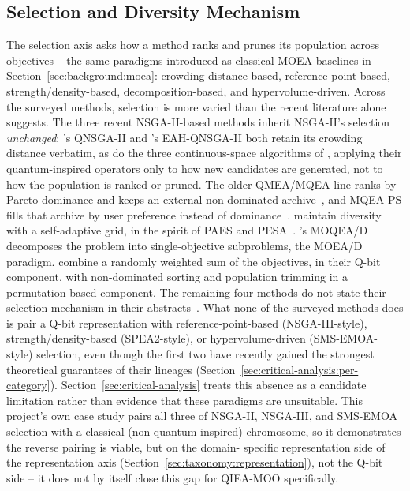 \subsection{Selection and Diversity Mechanism}
\label{sec:taxonomy:selection}

The selection axis asks how a method ranks and prunes its population
across objectives -- the same paradigms introduced as classical MOEA
baselines in Section~\ref{sec:background:moea}: crowding-distance-based,
reference-point-based, strength/density-based, decomposition-based, and
hypervolume-driven. Across the surveyed methods, selection is
more varied than the recent literature alone suggests. The three recent
NSGA-II-based methods inherit NSGA-II's selection \emph{unchanged}:
\citet{guzel2022qnsga2}'s QNSGA-II and \citet{kumar2026eahqnsga2}'s
EAH-QNSGA-II both retain its crowding distance verbatim, as do the three
continuous-space algorithms of \citet{olvera2023continuous}, applying
their quantum-inspired operators only to how new candidates are
generated, not to how the population is ranked or pruned. The older
QMEA/MQEA line ranks by Pareto dominance and keeps an external
non-dominated archive~\citep{kim2006qmea,kim2009mqea}, and MQEA-PS
fills that archive by user preference instead of
dominance~\citep{kim2011mqeaps}. \citet{zhang2012moqeavrp} maintain
diversity with a self-adaptive grid, in the spirit of PAES and
PESA~\citep{knowles2000paes,corne2000pesa}. \citet{deng2024moqead}'s
MOQEA/D decomposes the problem into single-objective subproblems, the
MOEA/D paradigm. \citet{li2007hqga} combine a randomly weighted sum of
the objectives, in their Q-bit component, with non-dominated sorting and
population trimming in a permutation-based component. The remaining
four methods do not state their selection mechanism in their
abstracts~\citep{wang2014powertrain,mousavi2019uav,deng2020gate,hussain2022moqiga}.
What none of the surveyed methods does is pair a Q-bit representation with
reference-point-based (NSGA-III-style), strength/density-based
(SPEA2-style), or hypervolume-driven (SMS-EMOA-style) selection, even
though the first two have recently gained the strongest theoretical
guarantees of their lineages
(Section~\ref{sec:critical-analysis:per-category}).
Section~\ref{sec:critical-analysis} treats this absence as a candidate
limitation rather than evidence that these paradigms are unsuitable.
This project's own case study pairs all three of NSGA-II, NSGA-III, and
SMS-EMOA selection with a classical (non-quantum-inspired) chromosome,
so it demonstrates the reverse pairing is viable, but on the domain-
specific representation side of the representation axis
(Section~\ref{sec:taxonomy:representation}), not the Q-bit side --
it does not by itself close this gap for QIEA-MOO specifically.

